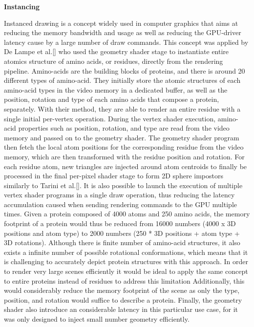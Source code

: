 \textbf{Instancing}

Instanced drawing is a concept widely used in computer graphics that aims at reducing the memory bandwidth and usage as well as reducing the GPU-driver latency cause by a large number of draw commands.
This concept was applied by De Lampe et al.[] who used the geometry shader stage to instantiate entire atomics structure of amino acids, or residues, directly from the rendering pipeline.
Amino-acids are the building blocks of proteins, and there is around 20 different types of amino-acid.
They initially store the atomic structures of each amino-acid types in the video memory in a dedicated buffer, as well as the position, rotation and type of each amino acids that compose a protein, separately.
With their method, they are able to render an entire residue with a single initial per-vertex operation.
During the vertex shader execution, amino-acid properties such as position, rotation, and type are read from the video memory and passed on to the geometry shader.
The geometry shader program then fetch the local atom positions for the corresponding residue from the video memory, which are then transformed with the residue position and rotation.
For each residue atom, new triangles are injected around atom centroids to finally be processed in the final per-pixel shader stage to form 2D sphere impostors similarly to Tarini et al.[].
It is also possible to launch the execution of multiple vertex shader programs in a single draw operation, thus reducing the latency accumulation caused when sending rendering commands to the GPU multiple times.
Given a protein composed of 4000 atoms and 250 amino acids, the memory footprint of a protein would thus be reduced from 16000 numbers (4000 x 3D positions and atom type) to 2000 numbers (250 * 3D positions + atom type + 3D rotations).
Although there is finite number of amino-acid structures, it also exists a infinite number of possible rotational conformations, which means that it is challenging to accurately depict protein structures with this approach.
In order to render very large scenes efficiently it would be ideal to apply the same concept to entire proteins instead of residues to address this limitation
Additionally, this would considerably reduce the memory footprint of the scene as only the type, position, and rotation would suffice to describe a protein.
Finally, the geometry shader also introduce an considerable latency in this particular use case, for it was only designed to inject small number geometry efficiently.

